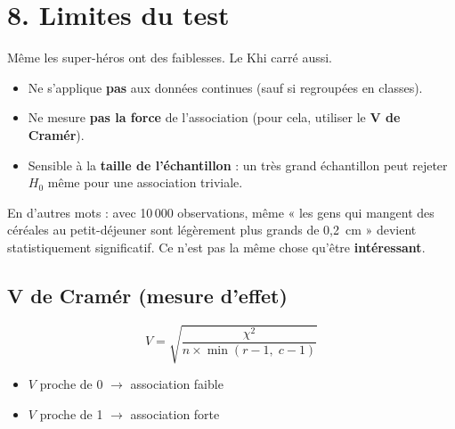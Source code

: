 \documentclass[12pt, a4paper]{article}
\begin{document}
\section{8. Limites du test}

\begin{humourbox}
Même les super-héros ont des faiblesses. Le Khi carré aussi.
\end{humourbox}

\vspace{0.5em}

\begin{itemize}
  \item Ne s'applique \textbf{pas} aux données continues (sauf si regroupées en classes).
  \item Ne mesure \textbf{pas la force} de l'association (pour cela, utiliser le
        \textbf{V de Cramér}).
  \item Sensible à la \textbf{taille de l'échantillon} : un très grand échantillon peut
        rejeter $H_0$ même pour une association triviale.
\end{itemize}

\begin{humourbox}
En d'autres mots : avec 10\,000 observations, même « les gens qui mangent des céréales
au petit-déjeuner sont légèrement plus grands de 0,2~cm » devient statistiquement
significatif. Ce n'est pas la même chose qu'être \textbf{intéressant}.
\end{humourbox}

\subsection{V de Cramér (mesure d'effet)}

\begin{equation}
  V = \sqrt{\frac{\chi^2}{n \times \min(r-1,\; c-1)}}
\end{equation}

\begin{itemize}
  \item $V$ proche de 0 $\rightarrow$ association faible
  \item $V$ proche de 1 $\rightarrow$ association forte
\end{itemize}
\end{document}
